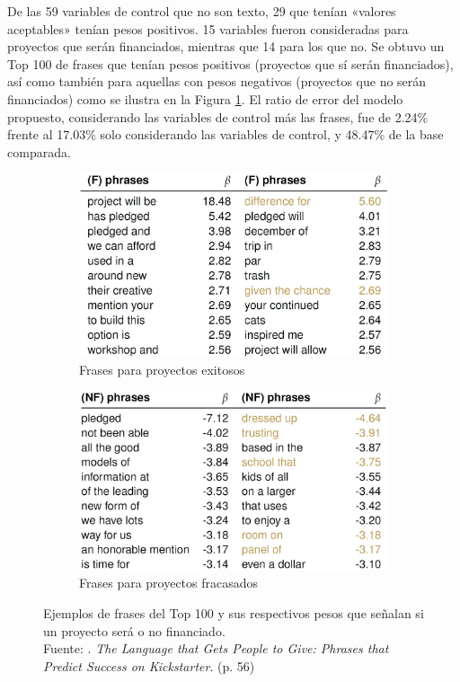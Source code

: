 De las 59 variables de control que no son texto, 29 que tenían «valores aceptables» tenían pesos positivos. 15 variables fueron consideradas para proyectos que serán financiados, mientras que 14 para los que no. Se obtuvo un Top 100 de frases que tenían pesos positivos (proyectos que sí serán financiados), así como también para aquellas con pesos negativos (proyectos que no serán financiados) como se ilustra en la Figura \ref{2:fig112}. El ratio de error del modelo propuesto, considerando las variables de control más las frases, fue de 2.24\% frente al 17.03\% solo considerando las variables de control, y 48.47\% de la base comparada.

\begin{figure}[!ht]
	\centering
	\small
	\begin{subfigure}{.5\textwidth}
		\centering
		\includegraphics[width=0.90\linewidth]{2/figures/mitra2014_resultadoA.jpg}
		\caption{Frases para proyectos exitosos}
	\end{subfigure}%
	\begin{subfigure}{.5\textwidth}
		\centering
		\includegraphics[width=0.90\linewidth]{2/figures/mitra2014_resultadoB.jpg}
		\caption{Frases para proyectos fracasados}
	\end{subfigure}
	\caption[Ejemplos de frases del Top 100 y sus respectivos pesos que señalan si un proyecto será o no financiado]{Ejemplos de frases del Top 100 y sus respectivos pesos que señalan si un proyecto será o no financiado.\\
		Fuente: \cite{pr_mitra2014phrases}. \textit{The Language that Gets People to Give: Phrases that Predict Success on Kickstarter}. (p. 56)}
	\label{2:fig112}
\end{figure}

